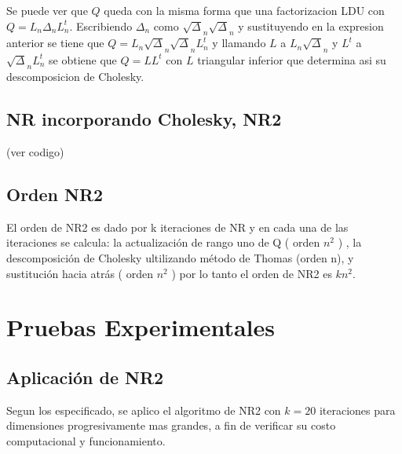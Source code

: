 \documentclass{endm}
\begin{document}
Se puede ver que $Q$ queda con la misma forma que una factorizacion LDU con $ Q = L_n\Delta_nL_{n}^{t} $.
Escribiendo $\Delta_n$ como $\sqrt\Delta_n\sqrt\Delta_n$ y sustituyendo en la expresion anterior se tiene que
$ Q = L_n\sqrt\Delta_n\sqrt\Delta_nL_{n}^{t} $ y llamando $L$ a $L_n\sqrt\Delta_n$ y $L^t$ a $\sqrt\Delta_nL_{n}^{t}$
se obtiene que $Q = LL^t$ con $L$ triangular inferior que determina asi su descomposicion de Cholesky.

\subsection{NR incorporando Cholesky, NR2}
(ver codigo)

\subsection{Orden NR2}
El orden de NR2 es dado por k iteraciones de NR y en cada una de las iteraciones se calcula: la actualización de rango uno de Q (  orden $n^{2}$ ) , la descomposición de Cholesky ultilizando método de Thomas (orden n), y sustitución hacia atrás (  orden $n^{2}$ ) por lo tanto el orden de NR2 es $kn^{2}$. 

\section{Pruebas Experimentales}

\subsection{Aplicación de NR2}
Segun los especificado, se aplico el algoritmo de NR2 con $k = 20$ iteraciones para dimensiones progresivamente mas grandes,
a fin de verificar su costo computacional y funcionamiento.

\end{document}
